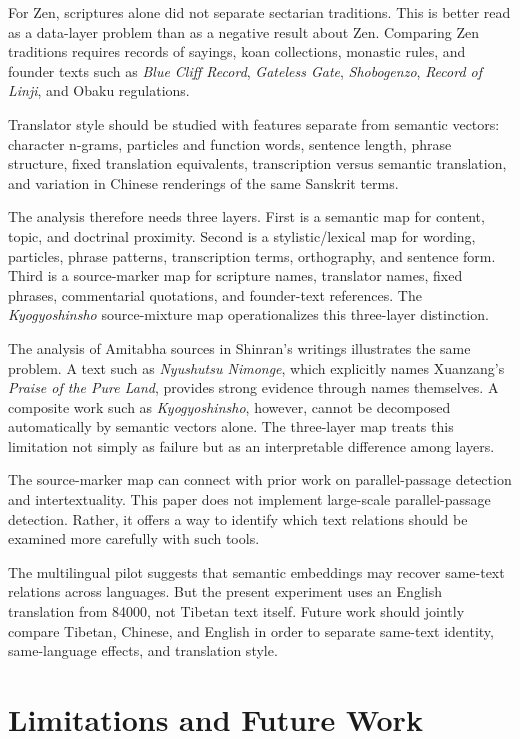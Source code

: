 \documentclass[uplatex,dvipdfmx,11pt,a4paper]{jsarticle}
\begin{document}
For Zen, scriptures alone did not separate sectarian traditions. This is better read as a data-layer problem than as a negative result about Zen. Comparing Zen traditions requires records of sayings, koan collections, monastic rules, and founder texts such as \textit{Blue Cliff Record}, \textit{Gateless Gate}, \textit{Shobogenzo}, \textit{Record of Linji}, and Obaku regulations.

Translator style should be studied with features separate from semantic vectors: character n-grams, particles and function words, sentence length, phrase structure, fixed translation equivalents, transcription versus semantic translation, and variation in Chinese renderings of the same Sanskrit terms.

The analysis therefore needs three layers. First is a semantic map for content, topic, and doctrinal proximity. Second is a stylistic/lexical map for wording, particles, phrase patterns, transcription terms, orthography, and sentence form. Third is a source-marker map for scripture names, translator names, fixed phrases, commentarial quotations, and founder-text references. The \textit{Kyogyoshinsho} source-mixture map operationalizes this three-layer distinction.

The analysis of Amitabha sources in Shinran's writings illustrates the same problem. A text such as \textit{Nyushutsu Nimonge}, which explicitly names Xuanzang's \textit{Praise of the Pure Land}, provides strong evidence through names themselves. A composite work such as \textit{Kyogyoshinsho}, however, cannot be decomposed automatically by semantic vectors alone. The three-layer map treats this limitation not simply as failure but as an interpretable difference among layers.

The source-marker map can connect with prior work on parallel-passage detection and intertextuality\cite{nehrdich2020,dharmanexus}. This paper does not implement large-scale parallel-passage detection. Rather, it offers a way to identify which text relations should be examined more carefully with such tools.

The multilingual pilot suggests that semantic embeddings may recover same-text relations across languages. But the present experiment uses an English translation from 84000, not Tibetan text itself. Future work should jointly compare Tibetan, Chinese, and English in order to separate same-text identity, same-language effects, and translation style.

\section{Limitations and Future Work}
\end{document}

